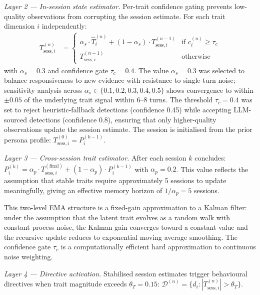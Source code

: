 \documentclass[10pt,a4paper]{report}
\begin{document}
\emph{Layer 2 --- In-session state estimator.} Per-trait confidence gating prevents low-quality observations from corrupting the session estimate. For each trait dimension $i$ independently:
\begin{align}
T_{\text{sess},i}^{(n)} &= \begin{cases}
\alpha_s \cdot \hat{T}_i^{(n)} + (1-\alpha_s)\cdot T_{\text{sess},i}^{(n-1)} & \text{if } c_i^{(n)} \geq \tau_c \\
T_{\text{sess},i}^{(n-1)} & \text{otherwise}
\end{cases}
\end{align}
with $\alpha_s = 0.3$ and confidence gate $\tau_c = 0.4$. The value $\alpha_s = 0.3$ was selected to balance responsiveness to new evidence with resistance to single-turn noise; sensitivity analysis across $\alpha_s \in \{0.1, 0.2, 0.3, 0.4, 0.5\}$ shows convergence to within $\pm 0.05$ of the underlying trait signal within 6--8 turns. The threshold $\tau_c = 0.4$ was set to reject heuristic-fallback detections (confidence 0.45) while accepting LLM-sourced detections (confidence 0.8), ensuring that only higher-quality observations update the session estimate. The session is initialised from the prior persona profile: $T_{\text{sess},i}^{(0)} = P_i^{(k-1)}$.

\emph{Layer 3 --- Cross-session trait estimator.} After each session $k$ concludes: $P_i^{(k)} = \alpha_p \cdot T_{\text{sess},i}^{(\text{final})} + (1-\alpha_p)\cdot P_i^{(k-1)}$ with $\alpha_p = 0.2$. This value reflects the assumption that stable traits require approximately 5 sessions to update meaningfully, giving an effective memory horizon of $1/\alpha_p = 5$ sessions.

This two-level EMA structure is a fixed-gain approximation to a Kalman filter: under the assumption that the latent trait evolves as a random walk with constant process noise, the Kalman gain converges toward a constant value and the recursive update reduces to exponential moving average smoothing. The confidence gate $\tau_c$ is a computationally efficient hard approximation to continuous noise weighting.

\emph{Layer 4 --- Directive activation.} Stabilised session estimates trigger behavioural directives when trait magnitude exceeds $\theta_T = 0.15$: $\mathcal{D}^{(n)} = \{ d_i : |T_{\text{sess},i}^{(n)}| > \theta_T \}$.
\end{document}
